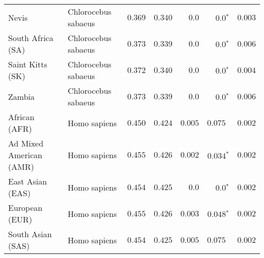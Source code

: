 \begin{center}
\begin{adjustbox}{width = 1\textwidth}
\begin{tabular}{|l|l|r|r|r|r|r|}
            Nevis               & Chlorocebus sabaeus & $ 0.369$ & $ 0.340$ & $0.0$    & $\bm{0.0{^*}}$    & $ 0.003$ \\
            South Africa (SA)                         & Chlorocebus sabaeus & $ 0.373$ & $ 0.339$ & $0.0$    & $\bm{0.0{^*}}$    & $ 0.006$ \\
            Saint Kitts (SK)                  & Chlorocebus sabaeus        & $ 0.372$ & $ 0.340$ & $0.0$ & $\bm{0.0{^*}}$        & $ 0.004$ \\
            Zambia        & Chlorocebus sabaeus        & $ 0.373$ & $ 0.339$ & $0.0$ & $\bm{0.0{^*}}$ & $ 0.006$ \\
            African (AFR)               & Homo sapiens        & $ 0.450$ & $ 0.424$ & $ 0.005$    & $ 0.075~~$    & $ 0.002$ \\
            Ad Mixed American (AMR)                 & Homo sapiens        & $ 0.455$ & $ 0.426$ & $ 0.002$ & $\bm{ 0.034{^*}}$ & $ 0.002$ \\
            East Asian (EAS)              & Homo sapiens        & $ 0.454$ & $ 0.425$ & $0.0$ & $\bm{0.0{^*}}$        & $ 0.002$ \\
            European (EUR)              & Homo sapiens        & $ 0.455$ & $ 0.426$ & $ 0.003$ & $\bm{ 0.048{^*}}$        & $ 0.002$ \\
            South Asian (SAS)              & Homo sapiens        & $ 0.454$ & $ 0.425$ & $ 0.005$ & $ 0.075~~$        & $ 0.002$ \\
            \bottomrule
        \end{tabular}
    \end{adjustbox}
\end{center}